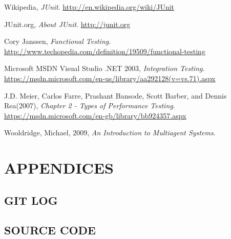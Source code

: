 \documentclass[11pt,a4paper]{article}
\begin{document}
\begin{thebibliography}{9}
	Wikipedia,
	\emph{JUnit}.
	\url{http://en.wikipedia.org/wiki/JUnit}
	
	JUnit.org,
	\emph{About JUnit}.
	\url{http://junit.org}
	
	Cory Janssen,
	\emph{Functional Testing}.
	\url{http://www.techopedia.com/definition/19509/functional-testing}
	
	Microsoft MSDN Visual Studio .NET 2003,
	\emph{Integration Testing}.
	\url{https://msdn.microsoft.com/en-us/library/aa292128(v=vs.71).aspx}
	
	J.D. Meier, Carlos Farre, Prashant Bansode, Scott Barber, and Dennis Rea(2007),
	\emph{Chapter 2 - Types of Performance Testing}.
	\url{https://msdn.microsoft.com/en-gb/library/bb924357.aspx}
	
	Wooldridge, Michael,  2009,
	\emph{An Introduction to Multiagent Systems}.
	
\end{thebibliography}

\newpage

\section{APPENDICES}

\subsection{GIT LOG}



\subsection{SOURCE CODE}


\end{document}

